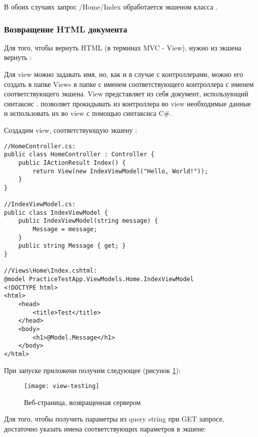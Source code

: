 \documentclass[a4paper,14pt]{extarticle}
\begin{document}
В обоих случаях запрос /Home/Index обработается экшеном  класса
.

\subsubsection{Возвращение HTML документа}

Для того, чтобы вернуть HTML (в терминах MVC - View), нужно из экшена вернуть
:


Для view можно задавать имя, но, как и в случае с контроллерами, можно его
создать в папке Views в папке с именем соответствующего контроллера с именем
соответствующего экшена. View представляет из себя  документ,
использующий синтаксис .  позволяет прокидывать из
контроллера во view необходимые данные и использовать их во view с помощью
синтаксиса C\#.

Создадим view, соответствующую экшену :

\begin{lstlisting}
//HomeController.cs:
public class HomeController : Controller {
    public IActionResult Index() {
        return View(new IndexViewModel("Hello, World!"));
    }
}

//IndexViewModel.cs:
public class IndexViewModel {
    public IndexViewModel(string message) {
        Message = message;
    }
    public string Message { get; }
}

//Views\Home\Index.cshtml:
@model PracticeTestApp.ViewModels.Home.IndexViewModel
<!DOCTYPE html>
<html>
    <head>
        <title>Test</title>
    </head>
    <body>
        <h1>@Model.Message</h1>
    </body>
</html>
\end{lstlisting}

При запуске приложени получим следующее (рисунок \ref{fig:view-testing}):

\begin{figure}[H]
    \centering
    \texttt{[image: view-testing]}
    \caption{Веб-страница, возвращенная сервером}
    \label{fig:view-testing}
\end{figure}

Для того, чтобы получить параметры из query string при GET запросе, достаточно
указать имена соответствующих параметров в экшене:

\end{document}

